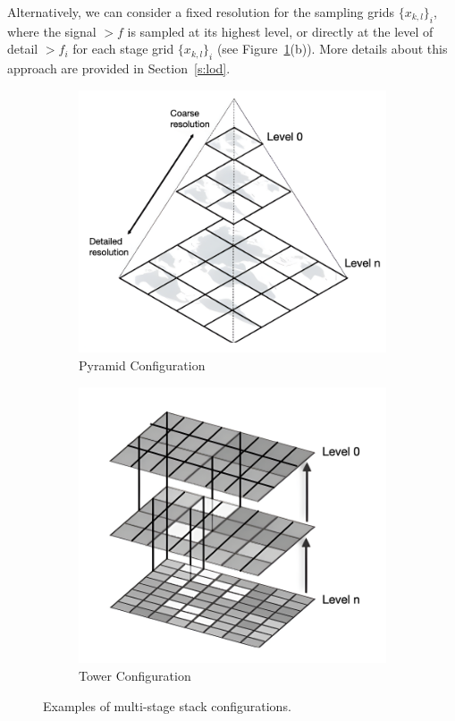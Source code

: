 Alternatively, we can consider a fixed resolution for the sampling grids \(\{x_{k,l}\}_i\), where the signal \(\gt{f}\) is sampled at its highest level, or directly at the level of detail \(\gt{f}_i\) for each stage grid \(\{x_{k,l}\}_i\) (see Figure~\ref{f:multi}(b)). More details about this approach are provided in Section~\ref{s:lod}.

\begin{figure}[!h]
\centering
\begin{subfigure}{0.49\linewidth}
\includegraphics[width=\linewidth]{img/ch4/pyramid.png}
\caption{Pyramid Configuration}
\end{subfigure}
\begin{subfigure}{0.49\linewidth}
\includegraphics[width=\linewidth]{img/ch4/tower.png}    
\caption{Tower Configuration}
\end{subfigure}
\caption{Examples of multi-stage stack configurations.}
\label{f:multi}
\end{figure}

